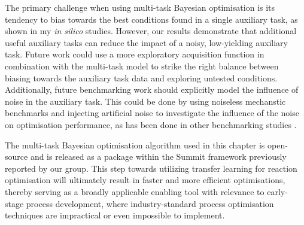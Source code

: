 The primary challenge when using multi-task Bayesian optimisation is its tendency to bias towards the best conditions found in a single auxiliary task, as shown in my \textit{in silico} studies. However, our results demonstrate that additional useful auxiliary tasks can reduce the impact of a noisy, low-yielding auxiliary task. Future work could use a more exploratory acquisition function in combination with the multi-task model to strike the right balance between biasing towards the auxiliary task data and exploring untested conditions. Additionally, future benchmarking work should explicitly model the influence of noise in the auxiliary task. This could be done by using noiseless mechanstic benchmarks and injecting artificial noise to investigate the influence of the noise on optimisation performance, as has been done in other benchmarking studies \cite{Heid2023b}.

The multi-task Bayesian optimisation algorithm used in this chapter is open-source and is released as a package within the Summit framework previously reported by our group. This step towards utilizing transfer learning for reaction optimisation will ultimately result in faster and more efficient optimisations, thereby serving as a broadly applicable enabling tool with relevance to early-stage process development, where industry-standard process optimisation techniques are impractical or even impossible to implement.


